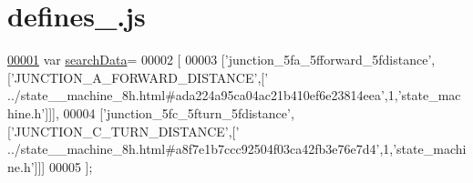 \hypertarget{defines__8_8js_source}{}\section{defines\+\_.\+js}
\label{defines__8_8js_source}

\begin{DoxyCode}
\hypertarget{defines__8_8js_source.tex_l00001}{}\hyperlink{defines__8_8js_ad01a7523f103d6242ef9b0451861231e}{00001} var \hyperlink{defines__8_8js_ad01a7523f103d6242ef9b0451861231e}{searchData}=
00002 [
00003   [\textcolor{stringliteral}{'junction\_5fa\_5fforward\_5fdistance'},[\textcolor{stringliteral}{'JUNCTION\_A\_FORWARD\_DISTANCE'},[\textcolor{stringliteral}{'
      ../state\_\_machine\_8h.html#ada224a95ca04ac21b410ef6e23814eea'},1,\textcolor{stringliteral}{'state\_machine.h'}]]],
00004   [\textcolor{stringliteral}{'junction\_5fc\_5fturn\_5fdistance'},[\textcolor{stringliteral}{'JUNCTION\_C\_TURN\_DISTANCE'},[\textcolor{stringliteral}{'
      ../state\_\_machine\_8h.html#a8f7e1b7ccc92504f03ca42fb3e76e7d4'},1,\textcolor{stringliteral}{'state\_machine.h'}]]]
00005 ];
\end{DoxyCode}
